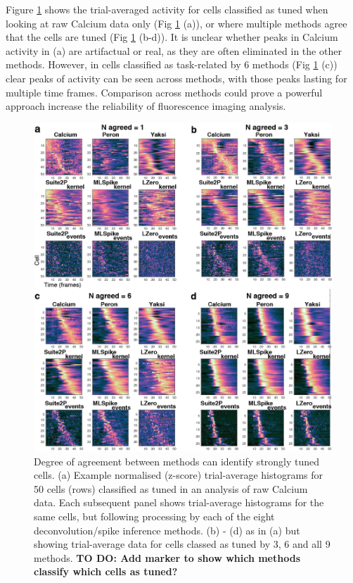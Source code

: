 \documentclass[a4paper,10pt,twocolumn]{article}
\begin{document}
Figure \ref{fig:tuned_cells_psth} shows the trial-averaged activity for cells classified as tuned when looking at raw Calcium data only (Fig \ref{fig:tuned_cells_psth} (a)), or where multiple methods agree that the cells are tuned (Fig \ref{fig:tuned_cells_psth} (b-d)). It is unclear whether peaks in Calcium activity in (a) are artifactual or real, as they are often eliminated in the other methods. However, in cells classified as task-related by 6 methods (Fig \ref{fig:tuned_cells_psth} (c)) clear peaks of activity can be seen across methods, with those peaks lasting for multiple time frames. Comparison across methods could prove a powerful approach increase the reliability of fluorescence imaging analysis.


\begin{figure}
\includegraphics[width=\textwidth]{full_figs/why_deconvolve_F5_2.png}
\caption{\label{fig:tuned_cells_psth}Degree of agreement between methods can identify strongly tuned cells. (a) Example normalised (z-score) trial-average histograms for 50 cells (rows) classified as tuned in an analysis of raw Calcium data. Each subsequent panel shows trial-average histograms for the same cells, but following processing by each of the eight deconvolution/spike inference methods. (b) - (d) as in (a) but showing trial-average data for cells classed as tuned by 3, 6 and all 9 methods. \textbf{TO DO: Add marker to show which methods classify which cells as tuned?}}
\end{figure}
\end{document}
